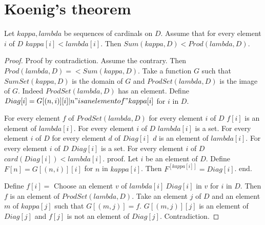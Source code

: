 \documentclass{document}
\begin{document}
  \section*{Koenig's theorem}

  \begin{forthel}
    \begin{theorem}[Koenig]
      Let $kappa, lambda$ be sequences of cardinals on $D$. Assume that for every element $i$ of $D$ $kappa[i] < lambda[i]$. Then $Sum(kappa,D) < Prod(lambda,D)$.
    \end{theorem}
    \begin{proof}
      Proof by contradiction. Assume the contrary. Then $Prod(lambda,D) =<
      Sum(kappa,D)$. Take a function $G$ such that $SumSet(kappa,D)$ is the domain of $G$ and $ProdSet(lambda,D)$ is the image of $G$. Indeed $ProdSet(lambda, D)$ has an element. Define $Diag[i] = {G[(n,i)][i] | n "is an element of" kappa[i]}$ for $i$ in $D$.

      For every element $f$ of $ProdSet(lambda, D)$ for every element $i$ of $D$ $f[i]$ is an element of $lambda[i]$.
      For every element $i$ of $D$ $lambda[i]$ is a set.
      For every element $i$ of $D$ for every element $d$ of $Diag[i]$ $d$ is an element of $lambda[i]$.
      For every element $i$ of $D$ $Diag[i]$ is a set.
      For every element $i$ of $D$ $card(Diag[i]) < lambda[i]$.
      proof.
        Let $i$ be an element of $D$. Define $F[n] = G[(n,i)][i]$ for $n$ in $kappa[i]$. Then $F^[kappa[i]] = Diag[i]$.
      end.

      Define $f[i] =$ Choose an element $v$ of $lambda[i] \ Diag[i]$ in $v$ for $i$ in $D$. Then $f$ is an element of $ProdSet(lambda,D)$. Take an element $j$ of $D$ and an element $m$ of $kappa[j]$ such that $G[(m,j)] = f$. $G[(m,j)][j]$ is an element of $Diag[j]$ and $f[j]$ is not an element of $Diag[j]$. Contradiction.
    \end{proof}
  \end{forthel}
\end{document}
